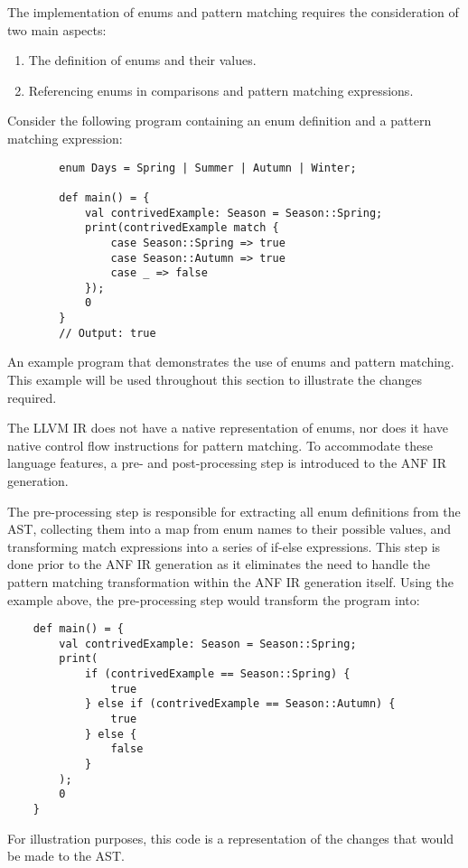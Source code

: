 The implementation of enums and pattern matching requires the consideration of two main aspects:
\begin{enumerate}
    \singlespacing
    \item The definition of enums and their values.
    \item Referencing enums in comparisons and pattern matching expressions.
\end{enumerate}
Consider the following program containing an enum definition and a pattern matching expression:

\begin{tcolorbox}
    \begin{verbatim}
        enum Days = Spring | Summer | Autumn | Winter;

        def main() = {
            val contrivedExample: Season = Season::Spring;
            print(contrivedExample match {
                case Season::Spring => true
                case Season::Autumn => true
                case _ => false
            });
            0
        }
        // Output: true
    \end{verbatim}
    \tcblower
    \footnotesize
    An example program that demonstrates the use of enums and pattern matching.
    This example will be used throughout this section to illustrate the changes required.
\end{tcolorbox}

The LLVM IR does not have a native representation of enums, nor does it have native control flow
instructions for pattern matching. To accommodate these language features, a pre- and
post-processing step is introduced to the ANF IR generation.

The pre-processing step is responsible for extracting all enum definitions from the AST, collecting
them into a map from enum names to their possible values, and transforming match expressions into a
series of if-else expressions. This step is done prior to the ANF IR generation as it eliminates the
need to handle the pattern matching transformation within the ANF IR generation itself. Using the
example above, the pre-processing step would transform the program into:

\begin{tcolorbox}
    \begin{verbatim}
    def main() = {
        val contrivedExample: Season = Season::Spring;
        print(
            if (contrivedExample == Season::Spring) {
                true
            } else if (contrivedExample == Season::Autumn) {
                true
            } else {
                false
            }
        );
        0
    }
    \end{verbatim}
    \tcblower
    \footnotesize
    For illustration purposes, this code is a representation of the changes that would be made to
    the AST.
\end{tcolorbox}

